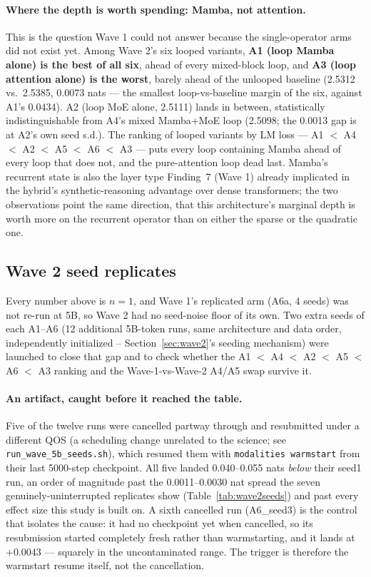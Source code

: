 \documentclass[11pt,a4paper]{article}
\begin{document}
\paragraph{Where the depth is worth spending: Mamba, not attention.} This is the question Wave 1
could not answer because the single-operator arms did not exist yet. Among Wave 2's six looped
variants, \textbf{A1 (loop Mamba alone) is the best of all six}, ahead of every mixed-block loop,
and \textbf{A3 (loop attention alone) is the worst}, barely ahead of the unlooped baseline (2.5312
vs.\ 2.5385, 0.0073 nats --- the smallest loop-vs-baseline margin of the six, against A1's 0.0434).
A2 (loop MoE alone, 2.5111) lands in between, statistically indistinguishable from A4's mixed
Mamba+MoE loop (2.5098; the 0.0013 gap is at A2's own seed s.d.). The ranking of looped
variants by LM loss --- A1 $<$ A4 $<$ A2 $<$ A5 $<$ A6 $<$ A3 --- puts every loop containing Mamba
ahead of every loop that does not, and the pure-attention loop dead last. Mamba's recurrent state is
also the layer type Finding~7 (Wave 1) already implicated in the hybrid's synthetic-reasoning
advantage over dense transformers; the two observations point the same direction, that this
architecture's marginal depth is worth more on the recurrent operator than on either the sparse or
the quadratic one.

\subsection{Wave 2 seed replicates}
\label{sec:wave2-seeds}

Every number above is $n=1$, and Wave 1's replicated arm (A6a, 4 seeds) was not re-run at 5B, so
Wave 2 had no seed-noise floor of its own. Two extra seeds of each A1--A6 (12 additional 5B-token
runs, same architecture and data order, independently initialized -- Section~\ref{sec:wave2}'s
seeding mechanism) were launched to close that gap and to check whether the
A1 $<$ A4 $<$ A2 $<$ A5 $<$ A6 $<$ A3 ranking and the Wave-1-vs-Wave-2 A4/A5 swap survive it.

\paragraph{An artifact, caught before it reached the table.} Five of the twelve runs were cancelled
partway through and resubmitted under a different QOS (a scheduling change unrelated to the science;
see \texttt{run\_wave\_5b\_seeds.sh}), which resumed them with \texttt{modalities warmstart} from
their last 5000-step checkpoint. All five landed 0.040--0.055 nats \emph{below} their seed1 run, an
order of magnitude past the 0.0011--0.0030 nat spread the seven genuinely-uninterrupted replicates
show (Table~\ref{tab:wave2seeds}) and past every effect size this study is built on. A sixth
cancelled run (A6\_seed3) is the control that isolates the cause: it had no checkpoint yet when
cancelled, so its resubmission started completely fresh rather than warmstarting, and it lands at
$+0.0043$ --- squarely in the uncontaminated range. The trigger is therefore the warmstart resume
itself, not the cancellation.
\end{document}
